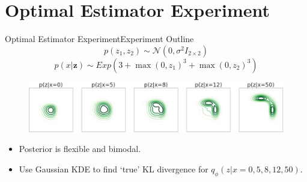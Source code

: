 \documentclass{beamer}
\begin{document}
\section{Optimal Estimator Experiment}
\begin{frame}{Optimal Estimator Experiment}{Experiment Outline}
\[p(z_1,z_2)\sim \mathcal{N} (0,\sigma^2 I_{2\times 2})\]
\[p(x|\bm{z})\sim Exp(3+\max(0,z_1)^3+\max(0,z_2)^3)\]
\begin{figure}[h]
\includegraphics[width=\textwidth]{sprinklertrue.png}
\end{figure}
\begin{itemize}
\item Posterior is flexible and bimodal.
\item Use Gaussian KDE to find `true' KL divergence for $q_\phi(z|x=0,5,8,12,50)$.
\end{itemize}
\end{frame}
\end{document}
